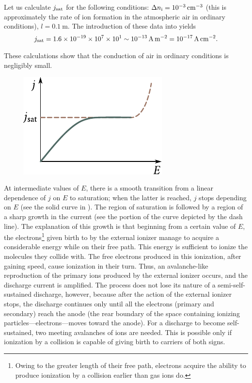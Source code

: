 Let us calculate $j_{\text{sat}}$ for the following conditions: $\Delta{n_{\text{i}}} = \SI{e-3}{\per\centi\metre\cubed}$ (this is approximately the rate of ion formation in the atmospheric air in ordinary conditions), $l = \SI{0.1}{\metre}$.
The introduction of these data into  yields
\begin{equation*}
    j_{\text{sat}} = \num{1.6e-19} \times \num{e7} \times \num{e1} \sim \SI{e-13}{\ampere\per\metre\squared} = \SI{e-17}{\ampere\per\centi\metre\squared}.
\end{equation*}

\noindent
These calculations show that the conduction of air in ordinary conditions is negligibly small.

\begin{figure}[t]
	\begin{center}
		\includegraphics[scale=1]{figures/ch_12/fig_12_2.pdf}
		\caption[]{}
		\label{fig:12_2}
	\end{center}
	\vspace{-0.8cm}
\end{figure}

At intermediate values of $E$, there is a smooth transition from a linear dependence of $j$ on $E$ to saturation; when the latter is reached, $j$ stops depending on $E$ (see the solid curve in ).
The region of saturation is followed by a region of a sharp growth in the current (see the portion of the curve depicted by the dash line).
The explanation of this growth is that beginning from a certain value of $E$, the electrons\footnote{Owing to the greater length of their free path, electrons acquire the ability to produce ionization by a collision earlier than gas ions do.} given birth to by the external ionizer manage to acquire a considerable energy while on their free path.
This energy is sufficient to ionize the molecules they collide with.
The free electrons produced in this ionization, after gaining speed, cause ionization in their turn.
Thus, an avalanche-like reproduction of the primary ions produced by the external ionizer occurs, and the discharge current is amplified.
The process does not lose its nature of a semi-self-
sustained discharge, however, because after the action of the external ionizer stops, the discharge continues only until all the electrons (primary and secondary) reach the anode (the rear boundary of the space containing ionizing particles---electrons---moves toward the anode).
For a discharge to become self-sustained, two meeting avalanches of ions are needed.
This is possible only if ionization by a collision is capable of giving birth to carriers of both signs.

